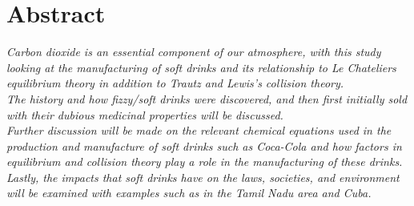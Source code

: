 \chapter*{Abstract}

\textit{Carbon dioxide is an essential component of our atmosphere, with this study looking at the manufacturing of soft drinks and its relationship to Le Chateliers equilibrium theory in addition to Trautz and Lewis’s collision theory. \\
The history and how fizzy/soft drinks were discovered, and then first initially sold with their dubious medicinal properties will be discussed. \\
Further discussion will be made on the relevant chemical equations used in the production and manufacture of soft drinks such as Coca-Cola and how factors in equilibrium and collision theory play a role in the manufacturing of these drinks. \\
Lastly, the impacts that soft drinks have on the laws, societies, and environment will be examined with examples such as in the Tamil Nadu area and Cuba.}



\clearpage